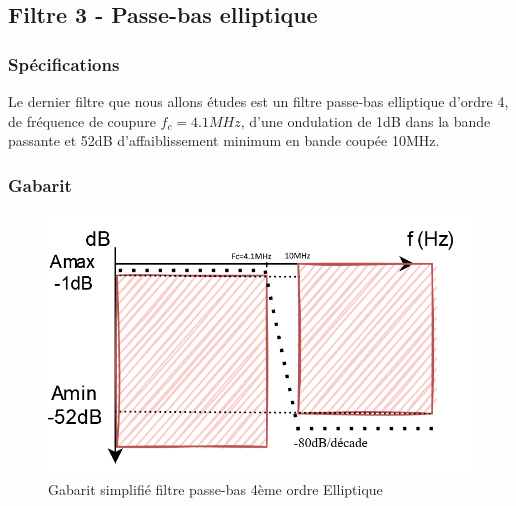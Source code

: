 \subsection{Filtre 3 - Passe-bas elliptique}
\begin{itemize}
    \subsubsection{Spécifications}
        \begin{flushleft}
            Le dernier filtre que nous allons études est un filtre passe-bas elliptique d'ordre 4, de fréquence de coupure $f_c=4.1MHz$, d'une ondulation de 1dB dans la bande passante et 52dB d'affaiblissement minimum en bande coupée 10MHz.
        \end{flushleft}
    \newpage
    \subsubsection{Gabarit}
    \begin{figure}[!htbp]
      \centering
      \includegraphics[scale=0.40]{img/elliptique.png}
      \caption{Gabarit simplifié filtre passe-bas 4ème ordre Elliptique}
      \label{fig:boat1}
    \end{figure}
    \FloatBarrier
    
\end{itemize}

\newpage






